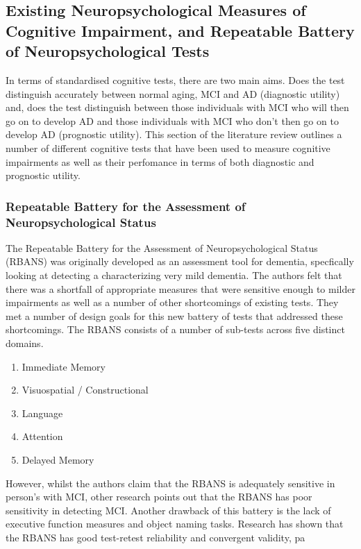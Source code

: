 \documentclass[12pt, twoside, a4paper]{article}
\begin{document}
\subsection{Existing Neuropsychological Measures of Cognitive Impairment, and Repeatable Battery of Neuropsychological Tests}
In terms of standardised cognitive tests, there are two main aims. Does the test distinguish accurately between normal aging, MCI and AD (diagnostic utility) and, does the test distinguish between those individuals with MCI who will then go on to develop AD and those individuals with MCI who don't then go on to develop AD (prognostic utility). This section of the literature review outlines a number of different cognitive tests that have been used to measure cognitive impairments as well as their perfomance in terms of both diagnostic and prognostic utility.
\par 
\subsubsection{Repeatable Battery for the Assessment of Neuropsychological Status}
The Repeatable Battery for the Assessment of Neuropsychological Status (RBANS) was originally developed as an assessment tool for dementia, specfically looking at detecting a characterizing very mild dementia. The authors felt that there was a shortfall of appropriate measures that were sensitive enough to milder impairments as well as a number of other shortcomings of existing tests. They met a number of design goals for this new battery of tests that addressed these shortcomings. The RBANS consists of a number of sub-tests across five distinct domains.

\begin{enumerate}
	\item Immediate Memory 
	\item Visuospatial / Constructional
	\item Language
	\item Attention
	\item Delayed Memory 
\end{enumerate}

However, whilst the authors claim that the RBANS is adequately sensitive in person's with MCI, other research points out that the RBANS has poor sensitivity in detecting MCI. Another drawback of this battery is the lack of executive function measures and object naming tasks. Research has shown that the RBANS has good test-retest reliability and convergent validity, pa
\end{document}

